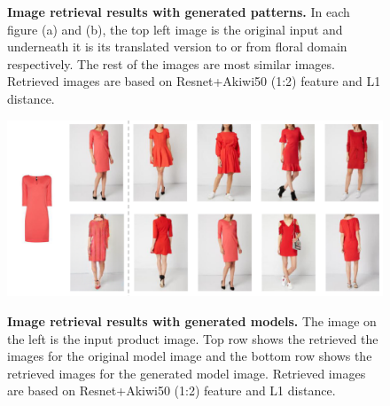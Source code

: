 \documentclass[12pt]{report}
\begin{document}
\begin{figure}[h]
\centering
{}\vspace{0.3cm}
\caption{\label{fig:search_weights} \textbf{Image retrieval results with generated patterns.} In each figure (a) and (b), the top left image is the original input and underneath it is its translated version to or from floral domain respectively. The rest of the images are most similar images. Retrieved images are based on Resnet+Akiwi50 (1:2) feature and L1 distance.}
\end{figure}

\begin{figure}[h]
\centering
{\includegraphics[width=\linewidth]{04_experiments/retrieval/generated/pix2pix_retrieval}}
\caption{\label{fig:search_weights} \textbf{Image retrieval results with generated models.} The image on the left is the input product image. Top row shows the retrieved the images for the original model image and the bottom row shows the retrieved images for the generated model image. Retrieved images are based on Resnet+Akiwi50 (1:2) feature and L1 distance.}
\end{figure}
\end{document}
